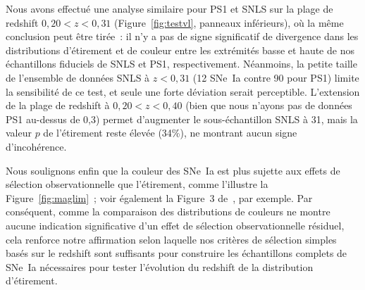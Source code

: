 \documentclass[../main/main.tex]{subfiles}
\begin{document}
Nous avons effectué une analyse similaire pour PS1 et SNLS sur la plage de
redshift $0,20 < z < 0,31$ (Figure~\ref{fig:testvl}, panneaux inférieurs), où la
même conclusion peut être tirée~: il n'y a pas de signe significatif de
divergence dans les distributions d'étirement et de couleur entre les extrémités
basse et haute de nos échantillons fiduciels de SNLS et PS1, respectivement.
Néanmoins, la petite taille de l'ensemble de données SNLS à $z < 0,31$ (12
SNe~Ia contre 90 pour PS1) limite la sensibilité de ce test, et seule une forte
déviation serait perceptible. L'extension de la plage de redshift à $0,20 < z <
0,40$ (bien que nous n'ayons pas de données PS1 au-dessus de 0,3) permet
d'augmenter le sous-échantillon SNLS à 31, mais la valeur $p$ de l'étirement
reste élevée (34\%), ne montrant aucun signe d'incohérence.

Nous soulignons enfin que la couleur des SNe~Ia est plus sujette aux effets de
sélection observationnelle que l'étirement, comme l'illustre la
Figure~\ref{fig:maglim}~; voir également la Figure~3 de~\cite{kessler2017}, par
exemple. Par conséquent, comme la comparaison des distributions de couleurs ne
montre aucune indication significative d'un effet de sélection observationnelle
résiduel, cela renforce notre affirmation selon laquelle nos critères de
sélection simples basés sur le redshift sont suffisants pour construire les
échantillons complets de SNe~Ia nécessaires pour tester l'évolution du redshift
de la distribution d'étirement.

\newpage

\thispagestyle{plain}
\vspace*{-3cm}
\vfill
\minilof
\vfill
\minilot
\vfill

% 
% 
\end{document}
